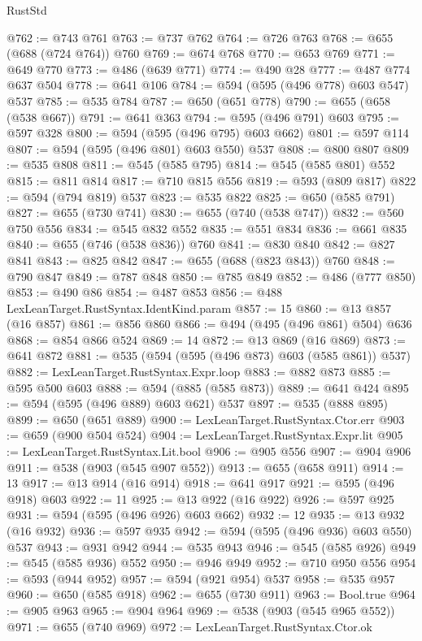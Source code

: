 \begin{lexlean}{RustStd}
\begin{coremodule}
@762 := @743 @761
@763 := @737 @762
@764 := @726 @763
@768 := @655 (@688 (@724 @764)) @760
@769 := @674 @768
@770 := @653 @769
@771 := @649 @770
@773 := @486 (@639 @771)
@774 := @490 @28
@777 := @487 @774 @637 @504
@778 := @641 @106
@784 := @594 (@595 (@496 @778) @603 @547) @537
@785 := @535 @784
@787 := @650 (@651 @778)
@790 := @655 (@658 (@538 @667))
@791 := @641 @363
@794 := @595 (@496 @791) @603
@795 := @597 @328
@800 := @594 (@595 (@496 @795) @603 @662)
@801 := @597 @114
@807 := @594 (@595 (@496 @801) @603 @550) @537
@808 := @800 @807
@809 := @535 @808
@811 := @545 (@585 @795)
@814 := @545 (@585 @801) @552
@815 := @811 @814
@817 := @710 @815 @556
@819 := @593 (@809 @817)
@822 := @594 (@794 @819) @537
@823 := @535 @822
@825 := @650 (@585 @791)
@827 := @655 (@730 @741)
@830 := @655 (@740 (@538 @747))
@832 := @560 @750 @556
@834 := @545 @832 @552
@835 := @551 @834
@836 := @661 @835
@840 := @655 (@746 (@538 @836)) @760
@841 := @830 @840
@842 := @827 @841
@843 := @825 @842
@847 := @655 (@688 (@823 @843)) @760
@848 := @790 @847
@849 := @787 @848
@850 := @785 @849
@852 := @486 (@777 @850)
@853 := @490 @86
@854 := @487 @853
@856 := @488 LexLeanTarget.RustSyntax.IdentKind.param
@857 := 15
@860 := @13 @857 (@16 @857)
@861 := @856 @860
@866 := @494 (@495 (@496 @861) @504) @636
@868 := @854 @866 @524
@869 := 14
@872 := @13 @869 (@16 @869)
@873 := @641 @872
@881 := @535 (@594 (@595 (@496 @873) @603 (@585 @861)) @537)
@882 := LexLeanTarget.RustSyntax.Expr.loop
@883 := @882 @873
@885 := @595 @500 @603
@888 := @594 (@885 (@585 @873))
@889 := @641 @424
@895 := @594 (@595 (@496 @889) @603 @621) @537
@897 := @535 (@888 @895)
@899 := @650 (@651 @889)
@900 := LexLeanTarget.RustSyntax.Ctor.err
@903 := @659 (@900 @504 @524)
@904 := LexLeanTarget.RustSyntax.Expr.lit
@905 := LexLeanTarget.RustSyntax.Lit.bool
@906 := @905 @556
@907 := @904 @906
@911 := @538 (@903 (@545 @907 @552))
@913 := @655 (@658 @911)
@914 := 13
@917 := @13 @914 (@16 @914)
@918 := @641 @917
@921 := @595 (@496 @918) @603
@922 := 11
@925 := @13 @922 (@16 @922)
@926 := @597 @925
@931 := @594 (@595 (@496 @926) @603 @662)
@932 := 12
@935 := @13 @932 (@16 @932)
@936 := @597 @935
@942 := @594 (@595 (@496 @936) @603 @550) @537
@943 := @931 @942
@944 := @535 @943
@946 := @545 (@585 @926)
@949 := @545 (@585 @936) @552
@950 := @946 @949
@952 := @710 @950 @556
@954 := @593 (@944 @952)
@957 := @594 (@921 @954) @537
@958 := @535 @957
@960 := @650 (@585 @918)
@962 := @655 (@730 @911)
@963 := Bool.true
@964 := @905 @963
@965 := @904 @964
@969 := @538 (@903 (@545 @965 @552))
@971 := @655 (@740 @969)
@972 := LexLeanTarget.RustSyntax.Ctor.ok

\end{coremodule}
\end{lexlean}
